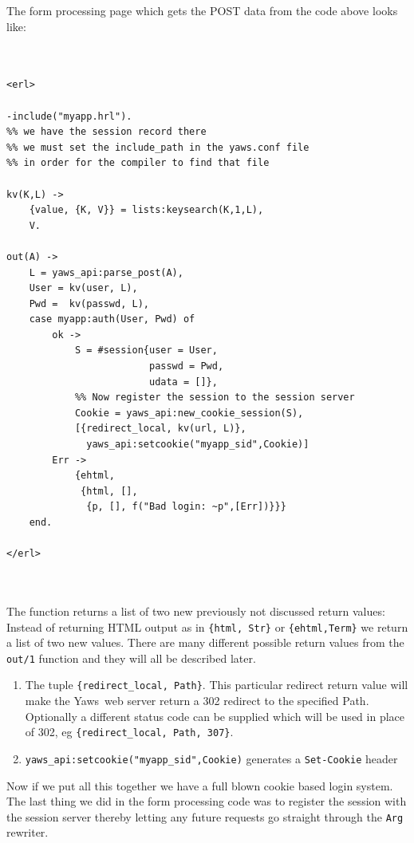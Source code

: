 \documentclass[11pt,oneside,english]{book}
\newcommand{\Yaws}            %
        {{\sc Yaws}}
\begin{document}
The form processing page which gets the POST data from the
code above looks like:
\begin{verbatim}


<erl>

-include("myapp.hrl").
%% we have the session record there
%% we must set the include_path in the yaws.conf file
%% in order for the compiler to find that file

kv(K,L) ->
    {value, {K, V}} = lists:keysearch(K,1,L),
    V.

out(A) ->
    L = yaws_api:parse_post(A),
    User = kv(user, L),
    Pwd =  kv(passwd, L),
    case myapp:auth(User, Pwd) of
        ok ->
            S = #session{user = User,
                         passwd = Pwd,
                         udata = []},
            %% Now register the session to the session server
            Cookie = yaws_api:new_cookie_session(S),
            [{redirect_local, kv(url, L)},
              yaws_api:setcookie("myapp_sid",Cookie)]
        Err ->
            {ehtml,
             {html, [],
              {p, [], f("Bad login: ~p",[Err])}}}
    end.

</erl>



\end{verbatim}

The function returns a list of two new previously not discussed return
values: Instead
of returning HTML output as in \verb+{html, Str}+ or
\verb+{ehtml,Term}+
we return a list of two new values. There are many different possible
return values from the \verb+out/1+ function and they will all be
described later.

\begin{enumerate}

\item The tuple \verb+{redirect_local, Path}+.
This particular redirect return value will make the
\Yaws\  web server return a 302 redirect to the specified Path.
Optionally a different status code can be supplied which will
be used in place of 302, eg \verb+{redirect_local, Path, 307}+.

\item \verb+yaws_api:setcookie("myapp_sid",Cookie)+ generates
a \verb+Set-Cookie+ header
\end{enumerate}



Now if we put all this together we have a full blown cookie based
login system. The last thing we did in the form processing code was
to register the session with the session server thereby letting any
future requests go straight through the \verb+Arg+ rewriter.
\end{document}
